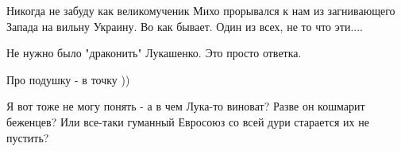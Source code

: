 \begin{itemize}

Никогда не забуду как великомученик Михо прорывался к нам из загнивающего
Запада на вильну Украину. Во как бывает. Один из всех, не то что эти....

Не нужно было "драконить" Лукашенко. Это просто ответка.

Про подушку - в точку ))


Я вот тоже не могу понять - а в чем Лука-то виноват? Разве он кошмарит
беженцев? Или все-таки гуманный Евросоюз со всей дури старается их не пустить?

\end{itemize} %
